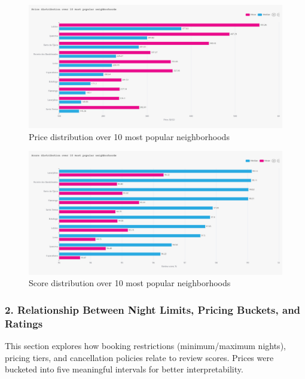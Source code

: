 \vspace{1em}
\begin{figure}[H]
    \centering
    \includegraphics[width=1\textwidth]{images/q1_1.jpg}
    \caption{Price distribution over 10 most popular neighborhoods}\label{fig:figureq1}
\end{figure}

\vspace{1em}
\begin{figure}[H]
    \centering
    \includegraphics[width=1\textwidth]{images/q1_2.jpg}
    \caption{Score distribution over 10 most popular neighborhoods}\label{fig:figureq2}
\end{figure}

\subsubsection*{2. Relationship Between Night Limits, Pricing Buckets, and Ratings }

This section explores how booking restrictions (minimum/maximum nights), pricing tiers, and cancellation policies relate to review scores. Prices were bucketed into five meaningful intervals for better interpretability.

\vspace{0.5em}
